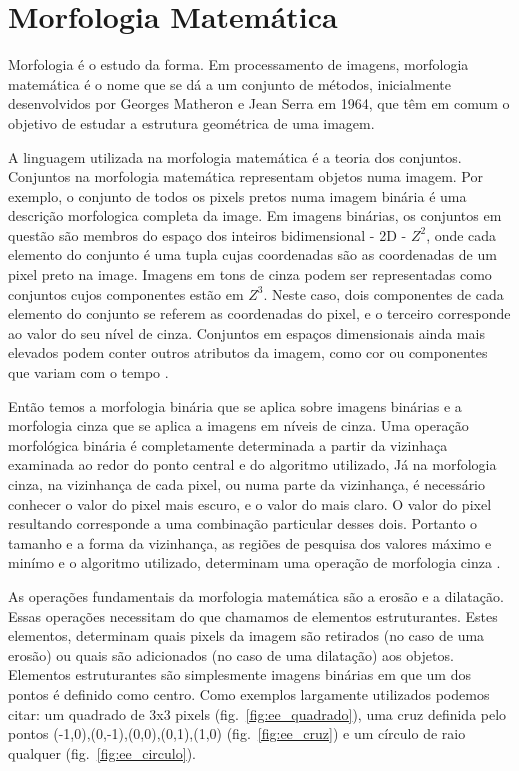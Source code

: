 \section{Morfologia Matemática}

Morfologia é o estudo da forma. Em processamento de imagens, morfologia matemática é o nome que se dá a um conjunto de métodos, inicialmente desenvolvidos por Georges Matheron e Jean Serra  em 1964, que têm em comum o objetivo de estudar a estrutura geométrica de uma imagem.

A linguagem utilizada na morfologia matemática é a teoria dos conjuntos. Conjuntos na morfologia matemática representam objetos numa imagem. Por exemplo, o conjunto de todos os pixels pretos numa imagem binária é uma descrição morfologica completa da image. Em imagens binárias, os conjuntos em questão são membros do espaço dos inteiros bidimensional - 2D - $Z^2$, onde cada elemento do conjunto é uma tupla cujas coordenadas são as coordenadas de um pixel preto na image. Imagens em tons de cinza podem ser representadas como conjuntos cujos componentes estão em $Z^3$. Neste caso, dois componentes de cada elemento do conjunto se referem as coordenadas do pixel, e o terceiro corresponde ao valor do seu nível de cinza. Conjuntos em espaços dimensionais ainda mais elevados podem conter outros atributos da imagem, como cor ou componentes que variam com o tempo \cite{gonzalez}.

Então temos a morfologia binária que se aplica sobre imagens binárias e a morfologia cinza que se aplica a imagens em níveis de cinza. Uma operação morfológica binária é completamente determinada a partir da vizinhaça examinada ao redor do ponto central e do algoritmo utilizado, Já na morfologia cinza, na vizinhança de cada pixel, ou numa parte da vizinhança, é necessário conhecer o valor do pixel mais escuro, e o valor do mais claro. O valor do pixel resultando corresponde a uma combinação particular desses dois. Portanto o tamanho e a forma da vizinhança, as regiões de pesquisa dos valores máximo e minímo e o algoritmo utilizado, determinam uma operação de morfologia cinza \cite{facon}.

As operações fundamentais da morfologia matemática são a erosão e a dilatação. Essas operações necessitam do que chamamos de elementos estruturantes. Estes elementos, determinam quais pixels da imagem são retirados (no caso de uma erosão) ou quais são adicionados (no caso de uma dilatação) aos objetos. Elementos estruturantes são simplesmente imagens binárias em que um dos pontos é definido como centro. Como exemplos largamente utilizados podemos citar: um quadrado de 3x3 pixels (fig.~\ref{fig:ee_quadrado}), uma cruz definida pelo pontos {(-1,0),(0,-1),(0,0),(0,1),(1,0)} (fig.~\ref{fig:ee_cruz}) e um círculo de raio qualquer (fig.~\ref{fig:ee_circulo}).

